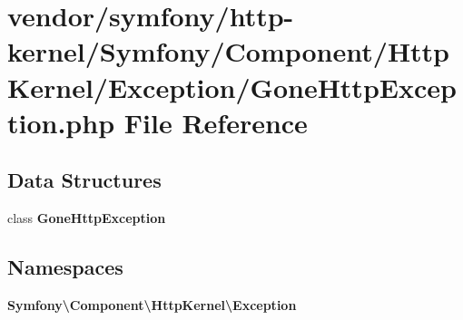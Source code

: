 \section{vendor/symfony/http-\/kernel/\+Symfony/\+Component/\+Http\+Kernel/\+Exception/\+Gone\+Http\+Exception.php File Reference}
\label{_gone_http_exception_8php}
\subsection*{Data Structures}
\begin{DoxyCompactItemize}
\item 
class {\bf Gone\+Http\+Exception}
\end{DoxyCompactItemize}
\subsection*{Namespaces}
\begin{DoxyCompactItemize}
\item 
 {\bf Symfony\textbackslash{}\+Component\textbackslash{}\+Http\+Kernel\textbackslash{}\+Exception}
\end{DoxyCompactItemize}
